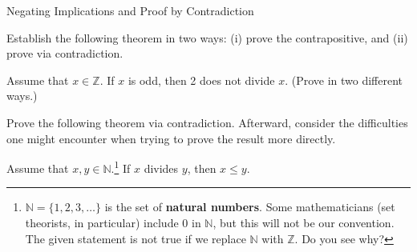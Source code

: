 \begin{section}{Negating Implications and Proof by Contradiction}
\begin{skeleton}
\begin{center}
\end{center}
\end{skeleton}

Establish the following theorem in two ways: (i) prove the contrapositive, and (ii) prove via contradiction.

\begin{theorem}
Assume that $x\in\mathbb{Z}$.  If $x$ is odd, then 2 does not divide $x$. (Prove in two different ways.)
\end{theorem}

Prove the following theorem via contradiction. Afterward, consider the difficulties one might encounter when trying to prove the result more directly.

\begin{theorem}
Assume that $x,y\in\mathbb{N}$.\footnote{$\mathbb{N}=\{1,2,3,\ldots\}$ is the set of \textbf{natural numbers}. Some mathematicians (set theorists, in particular) include $0$ in $\mathbb{N}$, but this will not be our convention. The given statement is not true if we replace $\mathbb{N}$ with $\mathbb{Z}$. Do you see why?} If $x$ divides $y$, then $x\leq y$.
\end{theorem}

\end{section}